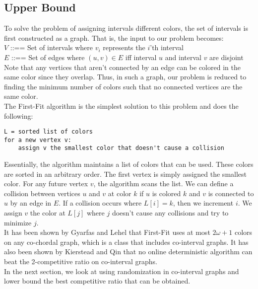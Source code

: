 \subsection{Upper Bound}
To solve the problem of assigning intervals different colors, the set of intervals is first constructed as a graph. That is, the input to our problem becomes:
\\$V$ ::== Set of intervals where $v_i$ represents the $i$'th interval
\\$E$ ::== Set of edges where $(u,v) \in E$ iff interval $u$ and interval $v$ are disjoint
\\Note that any vertices that aren't connected by an edge can be colored in the same color since they overlap. Thus, in such a graph, our problem is reduced to finding the minimum number of colors such that no connected vertices are the same color.
\\The First-Fit algorithm is the simplest solution to this problem and does the following:
\begin{verbatim}
L = sorted list of colors
for a new vertex v:
    assign v the smallest color that doesn't cause a collision
\end{verbatim}
Essentially, the algorithm maintains a list of colors that can be used. These colors are sorted in an arbitrary order. The first vertex is simply assigned the smallest color. For any future vertex $v$, the algorithm scans the list. We can define a collision between vertices $u$ and $v$ at color $k$ if $u$ is colored $k$ and $v$ is connected to $u$ by an edge in $E$. If a collision occurs where $L[i] = k$, then we increment $i$. We assign $v$ the color at $L[j]$ where $j$ doesn't cause any collisions and try to minimize $j$.
\\It has been shown by Gyarfas and Lehel that First-Fit uses at most $2\omega+1$ colors on any co-chordal graph, which is a class that includes co-interval graphs. It has also been shown by Kierstead and Qin that no online deterministic algorithm can beat the 2-competitive ratio on co-interval graphs.
\\In the next section, we look at using randomization in co-interval graphs and lower bound the best competitive ratio that can be obtained.
